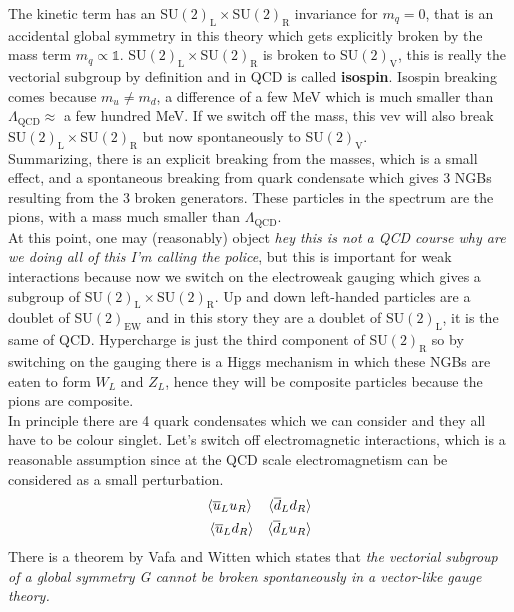\documentclass[../main.tex]{subfiles}
\begin{document}
The kinetic term has an SU$(2)_{\text{L}}\times$SU$(2)_{\text{R}}$ invariance for $m_q=0$, that is an accidental global symmetry in this theory which gets explicitly broken by the mass term $m_q\propto\mathbb{1}$. SU$(2)_{\text{L}}\times$SU$(2)_{\text{R}}$ is broken to SU$(2)_{\text{V}}$, this is really the vectorial subgroup by definition and in QCD is called \textbf{isospin}. Isospin breaking comes because $m_u\neq m_d$, a difference of a few MeV which is much smaller than $\Lambda_{\text{QCD}}\approx$\,\,a few hundred MeV. If we switch off the mass, this vev will also break SU$(2)_{\text{L}}\times$SU$(2)_{\text{R}}$ but now spontaneously to SU$(2)_{\text{V}}$.\\
Summarizing, there is an explicit breaking from the masses, which is a small effect, and a spontaneous breaking from quark condensate which gives 3 NGBs resulting from the 3 broken generators. These particles in the spectrum are the pions, with a mass much smaller than $\Lambda_{\text{QCD}}$.\\
At this point, one may (reasonably) object \textit{hey this is not a QCD course why are we doing all of this I'm calling the police}, but this is important for weak interactions because now we switch on the electroweak gauging which gives a subgroup of SU$(2)_{\text{L}}\times$SU$(2)_{\text{R}}$. Up and down left-handed particles are a doublet of SU$(2)_{\text{EW}}$ and in this story they are a doublet of SU$(2)_{\text{L}}$, it is the same of QCD. Hypercharge is just the third component of SU$(2)_{\text{R}}$ so by switching on the gauging there is a Higgs mechanism in which these NGBs are eaten to form $W_L$ and $Z_L$, hence they will be composite particles because the pions are composite.\\
In principle there are 4 quark condensates which we can consider and they all have to be colour singlet. Let's switch off electromagnetic interactions, which is a reasonable assumption since at the QCD scale electromagnetism can be considered as a small perturbation. 
\[
\begin{aligned}
    &\langle\overline{u}_Lu_R\rangle &\langle\overline{d}_Ld_R\rangle\\
    &\Braket{\overline{u}_Ld_R} &\langle\overline{d}_Lu_R\rangle
\end{aligned}
\]
There is a theorem by Vafa and Witten which states that \textit{the vectorial subgroup of a global symmetry G cannot be broken spontaneously in a vector-like gauge theory.}\\
\end{document}
